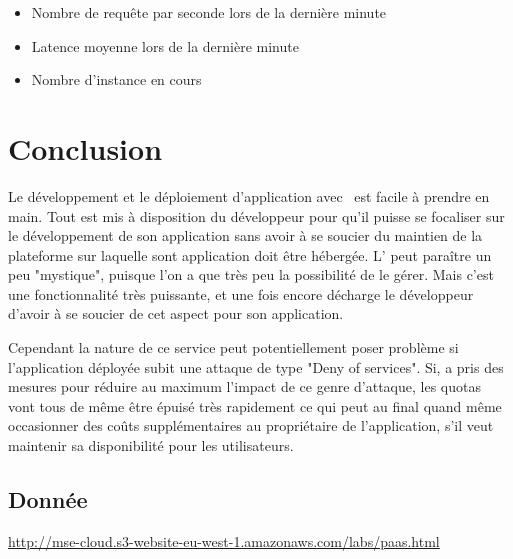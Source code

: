\documentclass[french]{msereport}
\newcommand{\gae}{\brand{Google App Engine}}
\begin{document}
			\begin{itemize}
				\item Nombre de requête par seconde lors de la dernière minute
				\item Latence moyenne lors de la dernière minute
				\item Nombre d'instance en cours
			\end{itemize}
			
	\section{Conclusion}
		Le développement et le déploiement d'application avec \gae\ est facile à prendre en main. Tout est mis à disposition du développeur pour qu'il puisse se focaliser sur le développement de son application sans avoir à se soucier du maintien de la plateforme sur laquelle sont application doit être hébergée. L' peut paraître un peu "mystique", puisque l'on a que très peu la possibilité de le gérer. Mais c'est une fonctionnalité très puissante, et une fois encore décharge le développeur d'avoir à se soucier de cet aspect pour son application.
		
		Cependant la nature de ce service peut potentiellement poser problème si l'application déployée subit une attaque de type "Deny of services". Si,  a pris des mesures pour réduire au maximum l'impact de ce genre d'attaque, les quotas vont tous de même être épuisé très rapidement ce qui peut au final quand même occasionner des coûts supplémentaires au propriétaire de l'application, s'il veut maintenir sa disponibilité pour les utilisateurs.

	\appendixsection
		
		\listoffigures
		
		\listoftables
		
		\subsection{Donnée}
			\url{http://mse-cloud.s3-website-eu-west-1.amazonaws.com/labs/paas.html}
\end{document}
